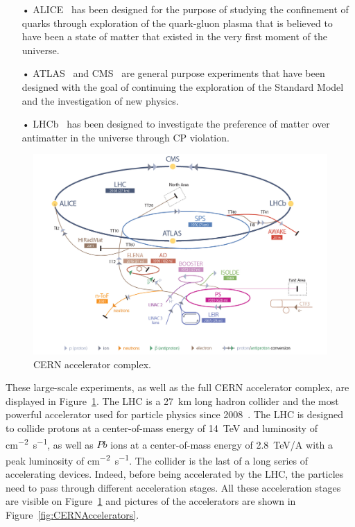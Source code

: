 	\begin{itemize}
		\item[•] ALICE~\cite{ALICELOI} has been designed for the purpose of studying the confinement of quarks through exploration of the quark-gluon plasma that is believed to have been a state of matter that existed in the very first moment of the universe.
		\item[•] ATLAS~\cite{ATLASLOI} and CMS~\cite{CMSLOI} are general purpose experiments that have been designed with the goal of continuing the exploration of the Standard Model and the investigation of new physics.
		\item[•] LHCb~\cite{LHCBLOI} has been designed to investigate the preference of matter over antimatter in the universe through CP violation.
	\end{itemize}

	\begin{figure}[H]
		\centering
		\includegraphics[width=\linewidth]{fig/chapt2/CERN_Accelerator_Complex.png}
		\caption{\label{fig:CERNComplex} CERN accelerator complex.}
	\end{figure}
	
	These large-scale experiments, as well as the full CERN accelerator complex, are displayed in Figure~\ref{fig:CERNComplex}. The LHC is a \SI{27}{km} long hadron collider and the most powerful accelerator used for particle physics since 2008~\cite{LHC2008}. The LHC is designed to collide protons at a center-of-mass energy of \SI{14}{TeV} and luminosity of  \si{cm^{-2}s^{-1}}, as well as $Pb$ ions at a center-of-mass energy of \SI{2.8}{TeV/A} with a peak luminosity of  \si{cm^{-2}s^{-1}}. The collider is the last of a long series of accelerating devices. Indeed, before being accelerated by the LHC, the particles need to pass through different acceleration stages. All these acceleration stages are visible on Figure~\ref{fig:CERNComplex} and pictures of the accelerators are shown in Figure~\ref{fig:CERNAccelerators}.

